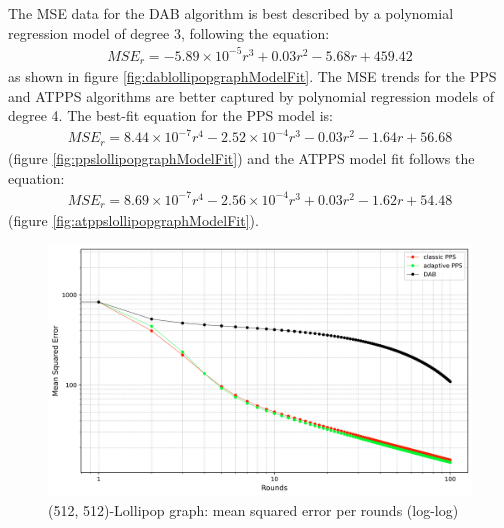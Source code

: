 The MSE data for the DAB algorithm is best described by a polynomial regression model of degree 3, following the equation:
\begin{align}
    MSE_r=-5.89\times10^{-5}r^{3}+0.03r^{2}-5.68r+459.42    
\end{align}
as shown in figure \ref{fig:dablollipopgraphModelFit}. The MSE trends for the PPS and ATPPS algorithms are better captured by polynomial regression models of degree 4. The best-fit equation for the PPS model is:
\begin{align}
    MSE_r=8.44\times 10^{-7}r^{4}-2.52\times 10^{-4}r^{3}-0.03r^{2}-1.64r+56.68    
\end{align}
(figure \ref{fig:ppslollipopgraphModelFit}) and the ATPPS model fit follows the equation:
\begin{align}
    MSE_r=8.69 \times 10^{-7}r^{4}-2.56 \times 10^{-4}r^{3}+0.03r^{2}-1.62r+54.48    
\end{align}
(figure \ref{fig:atppslollipopgraphModelFit}).

\begin{figure}[]
    \centering
    \includegraphics[width=\linewidth]{figures/Simulation_outcomes/LollipopGraph/512_512/DAB_vs_PPS_LG_r100_n1024_averaged_loglog.png}
    \caption{(512, 512)-Lollipop graph: mean squared error per rounds (log-log)}
    \label{fig:lollipopgraphMSEperRoundLogLog}
\end{figure}

